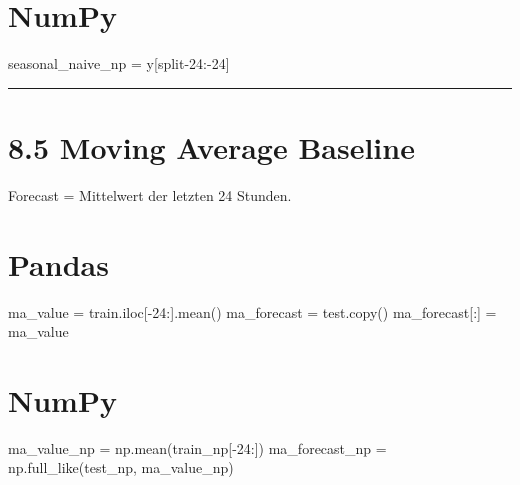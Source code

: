 \documentclass[
  ngerman,
  letterpaper,
  DIV=11]{scrreprt}
\newenvironment{Shaded}{\begin{snugshade}}{\end{snugshade}}
\newcommand{\DecValTok}[1]{\textcolor[rgb]{0.68,0.00,0.00}{#1}}
\newcommand{\NormalTok}[1]{\textcolor[rgb]{0.00,0.23,0.31}{#1}}
\newcommand{\OperatorTok}[1]{\textcolor[rgb]{0.37,0.37,0.37}{#1}}
\begin{document}
\section{NumPy}

\begin{Shaded}
\begin{Highlighting}[]
\NormalTok{seasonal\_naive\_np }\OperatorTok{=}\NormalTok{ y[split}\OperatorTok{{-}}\DecValTok{24}\NormalTok{:}\OperatorTok{{-}}\DecValTok{24}\NormalTok{]}
\end{Highlighting}
\end{Shaded}

\begin{center}\rule{0.5\linewidth}{0.5pt}\end{center}

\section{8.5 Moving Average Baseline}\label{moving-average-baseline}

Forecast = Mittelwert der letzten 24 Stunden.

\section{Pandas}

\begin{Shaded}
\begin{Highlighting}[]
\NormalTok{ma\_value }\OperatorTok{=}\NormalTok{ train.iloc[}\OperatorTok{{-}}\DecValTok{24}\NormalTok{:].mean()}
\NormalTok{ma\_forecast }\OperatorTok{=}\NormalTok{ test.copy()}
\NormalTok{ma\_forecast[:] }\OperatorTok{=}\NormalTok{ ma\_value}
\end{Highlighting}
\end{Shaded}

\section{NumPy}

\begin{Shaded}
\begin{Highlighting}[]
\NormalTok{ma\_value\_np }\OperatorTok{=}\NormalTok{ np.mean(train\_np[}\OperatorTok{{-}}\DecValTok{24}\NormalTok{:])}
\NormalTok{ma\_forecast\_np }\OperatorTok{=}\NormalTok{ np.full\_like(test\_np, ma\_value\_np)}
\end{Highlighting}
\end{Shaded}
\end{document}
